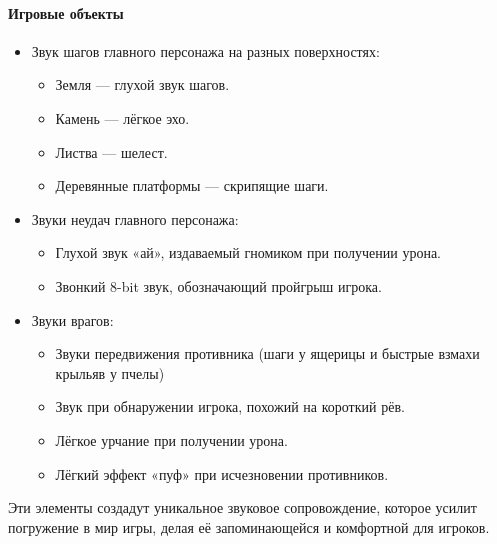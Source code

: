 \documentclass{article}
\begin{document}
\paragraph{Игровые объекты}  
\begin{itemize}
    \item Звук шагов главного персонажа на разных поверхностях:  
    \begin{itemize}
        \item Земля — глухой звук шагов.  
        \item Камень — лёгкое эхо.  
        \item Листва — шелест.  
        \item Деревянные платформы — скрипящие шаги.  
    \end{itemize}
    \item Звуки неудач главного персонажа:  
    \begin{itemize}
        \item Глухой звук «ай», издаваемый гномиком при получении урона.  
        \item Звонкий 8-bit звук, обозначающий пройгрыш игрока.  
    \end{itemize}
    \item Звуки врагов:  
    \begin{itemize}
        \item Звуки передвижения противника (шаги у ящерицы и быстрые взмахи крыльяв у пчелы)
        \item Звук при обнаружении игрока, похожий на короткий рёв.
        \item Лёгкое урчание при получении урона.  
        \item Лёгкий эффект «пуф» при исчезновении противников.  
    \end{itemize}
\end{itemize}

Эти элементы создадут уникальное звуковое сопровождение, которое усилит погружение в мир игры, делая её запоминающейся и комфортной для игроков.
\end{document}
